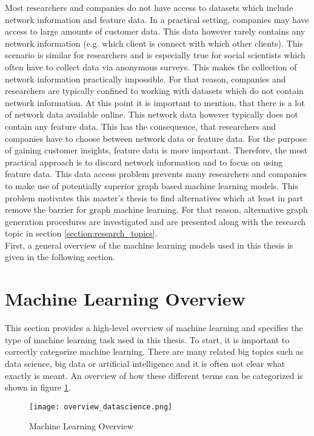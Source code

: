	\noindent Most researchers and companies do not have access to datasets which
	include network information and feature data. In a practical setting,
	companies may have access to large amounts of customer data. This data
	however rarely contains any network information (e.g. which client is
	connect with which other clients). This scenario is similar for researchers
	and is especially true for social scientists which often have to collect 
	data via anonymous surveys. This makes the collection of network information 
	practically impossible. For that reason, companies and researchers are 
	typically confined to working with datasets which do not contain network 
	information. At this point it is important to mention, that there is a lot 
	of network data available online. This network data however typically does 
	not contain any feature data. This has the consequence, that researchers and 
	companies have to choose between network data or feature data. For the 
	purpose of gaining customer insights, feature data is more important. 
	Therefore, the most practical approach is to discard network information 
	and to focus on using feature data. This data access problem prevents many 
	researchers and companies to make use of potentially superior graph based 
	machine learning models. This problem motivates this master's thesis to find
	alternatives which at least in part remove the barrier for graph machine 
	learning. For that reason, alternative graph generation procedures are
	investigated and are presented along with the research topic in section 
	\ref{section:research_topics}. \\

	\noindent First, a general overview of the machine learning models used in
	this thesis is given in the following section.
	
	\section{Machine Learning Overview}

	This section provides a high-level overview of machine learning and
	specifies the type of machine learning task used in this thesis. To
	start, it is important to correctly categorize machine learning. There are
	many related big topics such as data science, big data or artificial
	intelligence and it is often not clear what exactly is meant. An overview
	of how these different terms can be categorized is shown in figure 
	\ref{fig:ml_overview}.

	\begin{figure}[h]
		\centering
		\texttt{[image: overview\_datascience.png]}
		\caption{Machine Learning Overview}
		\citep{Frauenhofer2021}
		\label{fig:ml_overview}
	\end{figure} 

